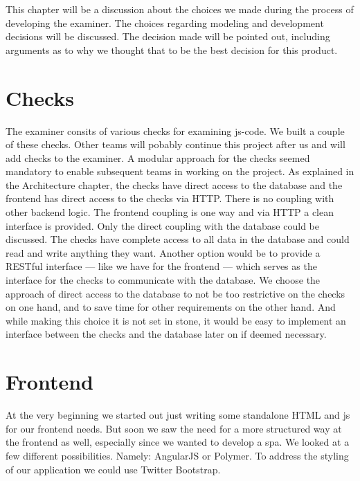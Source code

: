 %

This chapter will be a discussion about the choices we made
during the process of developing the \gls{examiner}.
The choices regarding modeling and development decisions will be discussed.
The decision made will be pointed out,
including arguments as to why we thought
that to be the best decision for this product.

\section{Checks}
The \gls{examiner} consits of various \glspl{check} for examining \gls{js-code}.
We built a couple of these \glspl{check}.
Other teams will pobably continue this project after us
and will add \glspl{check} to the \gls{examiner}.
A modular approach for the \glspl{check} seemed mandatory to enable
subsequent teams in working on the project.
As explained in the Architecture chapter,
the \glspl{check} have direct access to the database
and the frontend has direct access to the \glspl{check} via HTTP.
There is no coupling with other backend logic.
The frontend coupling is one way
and via HTTP a clean interface is provided.
Only the direct coupling with the database could be discussed.
The \glspl{check} have complete access to all data in the database
and could read and write anything they want.
Another option would be to provide a RESTful interface ---
like we have for the frontend ---
which serves as the interface for the \glspl{check} to communicate with the database.
We choose the approach of direct access to the database
to not be too restrictive on the \glspl{check} on one hand,
and to save time for other requirements on the other hand.
And while making this choice it is not set in stone,
it would be easy to implement an interface
between the \glspl{check} and the database later on if deemed necessary.

\section{Frontend}
At the very beginning we started out
just writing some standalone HTML and \gls{js} for our frontend needs.
But soon we saw the need for a more structured way at the frontend as well,
especially since we wanted to develop a \gls{spa}.
We looked at a few different possibilities.
Namely: AngularJS or Polymer.
To address the styling of our application we could use Twitter Bootstrap.

